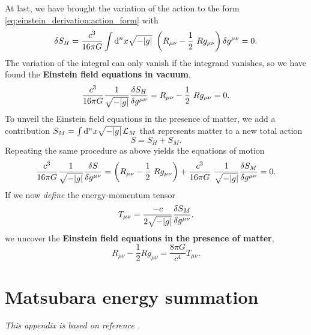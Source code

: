 At last, we have brought the variation of the action to the form \eqref{eq:einstein_derivation:action_form} with
\begin{equation}
	\variation{S_H} = \frac{c^3}{16 \pi G} \int \dif^n x \sqrt{-\det{g}} \left( R_{\mu \nu} - \frac{1}{2} R g_{\mu \nu} \right) \variation{g^{\mu \nu}} = 0 .
\end{equation}
The variation of the integral can only vanish if the integrand vanishes, so we have found the \textbf{Einstein field equations in vacuum},
\begin{equation}
	 \frac{c^3}{16 \pi G} \frac{1}{\sqrt{-\det{g}}} \fdv{S_H}{g^{\mu \nu}} = R_{\mu \nu} - \frac{1}{2} R g_{\mu \nu} = 0 .
	\label{eq:einstein_derivation:einstein_vacuum}
\end{equation}
To unveil the Einstein field equations in the presence of matter, we add a contribution $S_M = \int \mathop{}\!\mathrm{d}^n x \sqrt{-\lvert g \rvert} \, \mathcal{L}_M$ that represents matter to a new total action
\begin{equation}
	S = S_H + S_M .
\end{equation}
Repeating the same procedure as above yields the equations of motion
\begin{equation}
	\frac{c^3}{16 \pi G} \frac{1}{\sqrt{-\det{g}}} \fdv{S}{g^{\mu \nu}} = \left( R_{\mu \nu} - \frac{1}{2} R g_{\mu \nu} \right) + \frac{c^3}{16 \pi G} \frac{1}{\sqrt{-\det{g}}} \frac{\variation{S_M}}{\variation{g^{\mu \nu}}} = 0 .
\end{equation}
If we now \emph{define} the energy-momentum tensor
\begin{equation}
	T_{\mu \nu} = \frac{-c}{2 \sqrt{-\lvert g \rvert}} \frac{\delta S_M}{\delta g^{\mu \nu}} ,
\end{equation}
we uncover the \textbf{Einstein field equations in the presence of matter},
\begin{equation}
	R_{\mu \nu} - \frac{1}{2} R g_{\mu \nu} = \frac{8 \pi G}{c^4} T_{\mu \nu} .
	\label{eq:einstein_derivation:einstein_matter}
\end{equation}


\chapter{Matsubara energy summation}
\label{chap:matsum}

\textit{This appendix is based on reference \cite{ref:altland_simons}.}

